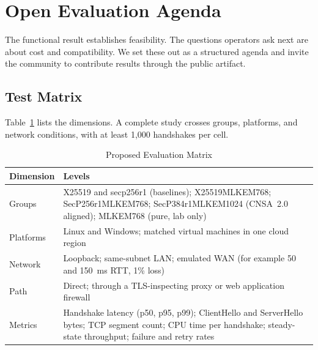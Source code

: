 \documentclass[conference]{IEEEtran}
\begin{document}
\section{Open Evaluation Agenda}
\label{sec:agenda}

The functional result establishes feasibility. The questions operators ask next are about cost and compatibility. We set these out as a structured agenda and invite the community to contribute results through the public artifact.

\subsection{Test Matrix}
Table~\ref{tab:matrix} lists the dimensions. A complete study crosses groups, platforms, and network conditions, with at least 1{,}000 handshakes per cell.

\begin{table}[t]
\centering
\caption{Proposed Evaluation Matrix}
\label{tab:matrix}
\footnotesize
\begin{tabular}{@{}>{\raggedright\arraybackslash}p{}>{\raggedright\arraybackslash}p{}@{}}
\toprule
Dimension & Levels \\
\midrule
Groups & X25519 and secp256r1 (baselines); X25519MLKEM768; SecP256r1MLKEM768; SecP384r1MLKEM1024 (CNSA~2.0 aligned); MLKEM768 (pure, lab only) \\
Platforms & Linux and Windows; matched virtual machines in one cloud region \\
Network & Loopback; same-subnet LAN; emulated WAN (for example 50 and 150~ms RTT, 1\% loss) \\
Path & Direct; through a TLS-inspecting proxy or web application firewall \\
Metrics & Handshake latency (p50, p95, p99); ClientHello and ServerHello bytes; TCP segment count; CPU time per handshake; steady-state throughput; failure and retry rates \\
\bottomrule
\end{tabular}
\end{table}
\end{document}

